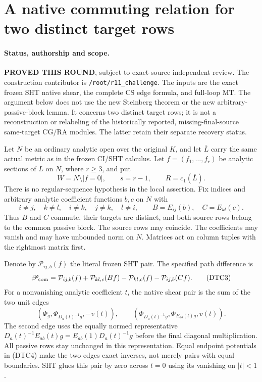 \section{A native commuting relation for two distinct target rows}
\label{sec:r11-distinct-target-commuting}

\paragraph{Status, authorship and scope.}
\textbf{PROVED THIS ROUND}, subject to exact-source independent review.
The construction contributor is \texttt{/root/r11\_challenge}.
The inputs are the exact frozen SHT native shear, the complete CS edge
formula, and full-loop MT.  The argument below does not use the new
Steinberg theorem or the new arbitrary-passive-block lemma.  It concerns
two distinct target rows; it is not a reconstruction or relabeling of
the historically reported, missing-final-source same-target CG/RA
modules.  The latter retain their separate recovery status.

Let $N$ be an ordinary analytic open over the original $K$, and let
$\overline L$ carry the same actual metric as in the frozen CI/SHT
calculus.  Let $f=(f_1,\ldots,f_r)$ be analytic sections of $L$ on $N$,
where $r\ge3$, and put
\[
 W=N\setminus |f=0|,\qquad s=r-1,\qquad R=c_1(\overline L).
 \tag{DTC1}
\]
There is no regular-sequence hypothesis in the local assertion.  Fix
indices and arbitrary analytic coefficient functions $b,c$ on $N$ with
\[
 i\ne j,\quad k\ne l,\quad i\ne k,\quad j\ne k,\quad l\ne i,
 \qquad B=E_{ij}(b),\quad C=E_{kl}(c).
 \tag{DTC2}
\]
Thus $B$ and $C$ commute, their targets are distinct, and both source
rows belong to the common passive block.  The source rows may coincide.
The coefficients may vanish and may have unbounded norm on $N$.
Matrices act on column tuples with the rightmost matrix first.

Denote by $\mathcal P_{ij,b}(f)$ the literal frozen SHT pair.  The
specified path difference is
\[
 \mathscr P_{\rm com}
 =\mathcal P_{ij,b}(f)+\mathcal P_{kl,c}(Bf)
  -\mathcal P_{kl,c}(f)-\mathcal P_{ij,b}(Cf).
 \tag{DTC3}
\]
For a nonvanishing analytic coefficient $t$, the native shear pair is
the sum of the two unit edges
\[
 (\Phi_g,\Phi_{D_a(t)^{-1}g},-v(t)),\qquad
 (\Phi_{D_a(t)^{-1}g},\Phi_{E_{ab}(t)g},v(t)).
 \tag{DTC4}
\]
The second edge uses the equally normed representative
$D_a(t)^{-1}E_{ab}(t)g=E_{ab}(1)D_a(t)^{-1}g$ before the final
diagonal multiplication.  All passive rows stay unchanged in this
representation.  Equal endpoint potentials in (DTC4) make the two
edges exact inverses, not merely pairs with equal boundaries.  SHT
glues this pair by zero across $t=0$ using its vanishing on $|t|<1$.


